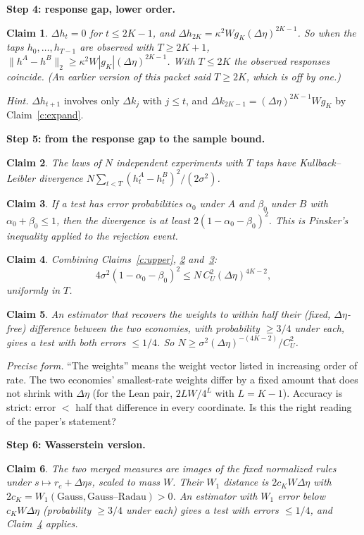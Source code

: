 \documentclass[11pt]{article}
\newtheorem{claim}{Claim}
\begin{document}
\textbf{Step 4: response gap, lower order.}
\begin{claim}\label{c:lower} $\Delta h_t=0$ for $t\le2K-1$, and $\Delta h_{2K}=\kappa^2Wg_K(\Delta\eta)^{2K-1}$. So when the taps $h_0,\ldots,h_{T-1}$ are observed with $T\ge2K+1$, $\|h^A-h^B\|_2\ge\kappa^2W|g_K|(\Delta\eta)^{2K-1}$. With $T\le2K$ the observed responses coincide. (An earlier version of this packet said $T\ge2K$, which is off by one.)\end{claim}
\textit{Hint.} $\Delta h_{t+1}$ involves only $\Delta k_j$ with $j\le t$, and $\Delta k_{2K-1}=(\Delta\eta)^{2K-1}Wg_K$ by Claim~\ref{c:expand}.

\textbf{Step 5: from the response gap to the sample bound.}
\begin{claim}\label{c:kl} The laws of $N$ independent experiments with $T$ taps have Kullback--Leibler divergence $N\sum_{t<T}(h^A_t-h^B_t)^2/(2\sigma^2)$.\end{claim}
\begin{claim}\label{c:pinsker} If a test has error probabilities $\alpha_0$ under $A$ and $\beta_0$ under $B$ with $\alpha_0+\beta_0\le1$, then the divergence is at least $2(1-\alpha_0-\beta_0)^2$. This is Pinsker's inequality applied to the rejection event.\end{claim}
\begin{claim}\label{c:N} Combining Claims~\ref{c:upper}, \ref{c:kl} and~\ref{c:pinsker}:
\[
4\sigma^2(1-\alpha_0-\beta_0)^2\le N\,C_U^2(\Delta\eta)^{4K-2},
\]
uniformly in $T$.\end{claim}
\begin{claim}\label{c:reduce} An estimator that recovers the weights to within half their (fixed, $\Delta\eta$-free) difference between the two economies, with probability $\ge3/4$ under each, gives a test with both errors $\le1/4$. So $N\ge\sigma^2(\Delta\eta)^{-(4K-2)}/C_U^2$.\end{claim}
\textit{Precise form.} ``The weights'' means the weight vector listed in increasing order of rate. The two economies' smallest-rate weights differ by a fixed amount that does not shrink with $\Delta\eta$ (for the Lean pair, $2LW/4^L$ with $L=K-1$). Accuracy is strict: error $<$ half that difference in every coordinate. Is this the right reading of the paper's statement?

\textbf{Step 6: Wasserstein version.}
\begin{claim}\label{c:w1} The two merged measures are images of the fixed normalized rules under $s\mapsto r_c+\Delta\eta s$, scaled to mass $W$. Their $W_1$ distance is $2c_KW\Delta\eta$ with $2c_K=W_1(\text{Gauss},\text{Gauss--Radau})>0$. An estimator with $W_1$ error below $c_KW\Delta\eta$ (probability $\ge3/4$ under each) gives a test with errors $\le1/4$, and Claim~\ref{c:N} applies.\end{claim}
\end{document}
